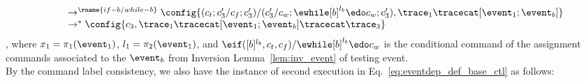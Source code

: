 \begin{subproof}
\begin{equation}
\begin{array}{l}
  \\
  \qquad 
   \rightarrow^{\rname{if-b / while-b}} 
  \config{(c_t;c_3' / c_f;c_3') /(c_3' / c_w; \ewhile [b]^{l_b} \edo c_w;{c}_3'), 
  \trace_1 \tracecat [\event_1;\event_b]} 
  \\
  \qquad   \rightarrow^{*} 
  \config{c_3, 
  \trace_1 \tracecat [\event_1;\event_b] \tracecat  \trace_3}
\end{array}
\end{equation}
, where $x_1 = \pi_1(\event_1)$, $l_1 = {\pi_2(\event_1)}$, 
and $\eif ([b]^{l_b}, c_t, c_f) / \ewhile [b]^{l_b} \edo c_w$ 
is the conditional command of the assignment commands 
associated to the $\event_b$ from Inversion Lemma~\ref{lem:inv_event} of testing event.
\\
%
By the command label consistency,
we also have the instance of second execution in Eq.~\ref{eq:eventdep_def_base_ctl} as follows:

\end{subproof}
